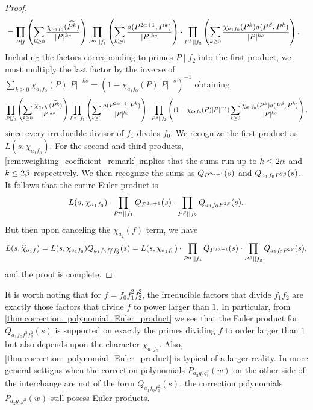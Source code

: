 \documentclass[12pt,reqno,oneside]{amsart}
\begin{document}
\begin{proof}
\begin{align*}
            &= \prod_{P \nmid f}\left(\sum_{k \ge 0}\frac{\chi_{a_{1}f_{0}}(\widehat{P^{k}})}{|P|^{ks}}\right)\prod_{P^{\alpha} \mid\mid f_{1}}\left(\sum_{k \ge 0}\frac{a(P^{2\alpha+1},P^{k})}{|P|^{ks}}\right) \cdot \prod_{P^{\beta} \mid\mid f_{2}}\left(\sum_{k \ge 0}\frac{\chi_{a_{1}f_{0}}(P^{k})a(P^{\beta},P^{k})}{|P|^{ks}}\right).
        \end{align*}
        Including the factors corresponding to primes $P \mid f_{2}$ into the first product, we must multiply the last factor by the inverse of $\sum_{k \ge 0}\chi_{a_{1}f_{0}}(P)|P|^{-ks} = (1-\chi_{a_{1}f_{0}}(P)|P|^{-s})^{-1}$ obtaining
        \[
            \prod_{P \nmid f_{0}}\left(\sum_{k \ge 0}\frac{\chi_{a_{1}f_{0}}(\widehat{P^{k}})}{|P|^{ks}}\right)\prod_{P^{\alpha} \mid\mid f_{1}}\left(\sum_{k \ge 0}\frac{a(P^{2\alpha+1},P^{k})}{|P|^{ks}}\right) \cdot \prod_{P^{\beta} \mid\mid f_{2}}\left((1-\chi_{a_{1}f_{0}}(P)|P|^{-s})\sum_{k \ge 0}\frac{\chi_{a_{1}f_{0}}(P^{k})a(P^{\beta},P^{k})}{|P|^{ks}}\right),
        \]
        since every irreducible divisor of $f_{1}$ divdes $f_{0}$. We recognize the first product as $L(s,\chi_{a_{1}f_{0}})$. For the second and third products, \cref{rem:weighting_coefficient_remark} implies that the sums run up to $k \le 2\alpha$ and $k \le 2\beta$ respectively. We then recognize the sums as $Q_{P^{2\alpha+1}}(s)$ and $Q_{a_{1}f_{0}P^{2\beta}}(s)$. It follows that the entire Euler product is
        \[
            L(s,\chi_{a_{1}f_{0}}) \cdot \prod_{P^{\alpha} \mid\mid f_{1}}Q_{P^{2\alpha+1}}(s) \cdot \prod_{P^{\beta} \mid\mid f_{2}}Q_{a_{1}f_{0}P^{2\beta}}(s).
        \]
        But then upon canceling the $\chi_{a_{2}}(f)$ term, we have
        \[
            L(s,\widehat{\chi}_{a_{1}f}) = L(s,\chi_{a_{1}f_{0}})Q_{a_{1}f_{0}f_{1}^{2}f_{2}^{2}}(s) = L(s,\chi_{a_{1}f_{0}}) \cdot \prod_{P^{\alpha} \mid\mid f_{1}}Q_{P^{2\alpha+1}}(s) \cdot \prod_{P^{\beta} \mid\mid f_{2}}Q_{a_{1}f_{0}P^{2\beta}}(s),
        \]
        and the proof is complete.
    \end{proof}

    It is worth noting that for $f = f_{0}f_{1}^{2}f_{2}^{2}$, the irreducible factors that divide $f_{1}f_{2}$ are exactly those factors that divide $f$ to power larger than $1$. In particular, from \cref{thm:correction_polynomial_Euler_product} we see that the Euler product for $Q_{a_{1}f_{0}f_{1}^{2}f_{2}^{2}}(s)$ is supported on exactly the primes dividing $f$ to order larger than $1$ but also depends upon the character $\chi_{a_{1}f_{0}}$. Also, \cref{thm:correction_polynomial_Euler_product} is typical of a larger reality. In more general settigns when the correction polynomials $P_{a_{2}g_{0}g_{1}^{2}}(w)$ on the other side of the interchange are not of the form $Q_{a_{1}f_{0}f_{1}^{2}}(s)$, the correction polynomials $P_{a_{2}g_{0}g_{1}^{2}}(w)$ still posess Euler products.
\end{document}
